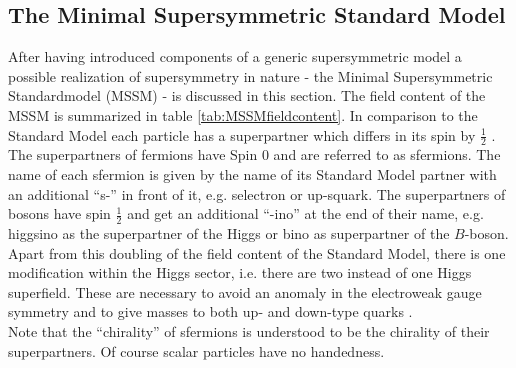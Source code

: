 \subsection{The Minimal Supersymmetric Standard Model}
After having introduced components of a generic supersymmetric model a possible realization of supersymmetry in nature - the Minimal Supersymmetric Standardmodel (MSSM) - is discussed in this section. 
The field content of the MSSM is summarized in table \ref{tab:MSSMfieldcontent}. In comparison to the Standard Model each particle has a superpartner which differs in its spin by $\frac{1}{2}$ . The superpartners of fermions have Spin 0 and are referred to as sfermions. The name of each sfermion is given by the name of its Standard Model partner with an additional ``s-'' in front of it, e.g. selectron or up-squark. The superpartners of bosons have spin $\frac{1}{2}$ and get an additional ``-ino'' at the end of their name, e.g. higgsino as the superpartner of the Higgs or bino as superpartner of the $B$-boson.\\
Apart from this doubling of the field content of the Standard Model, there is one modification within the Higgs sector, i.e. there are two instead of one Higgs superfield. These are necessary to avoid an anomaly in the electroweak gauge symmetry and to give masses to both up- and down-type quarks \cite[page 8]{Martin:1997ns}.\\
Note that the ``chirality'' of sfermions is understood to be the chirality of their superpartners. Of course scalar particles have no handedness.
